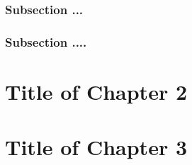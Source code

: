 \documentclass[13pt,a4paper]{extreport}
\begin{document}
\justifying
\subsection{Subsection ...}

\justifying
\subsection{Subsection ....}



\justifying
\chapter{Title of Chapter 2}





\justifying
\chapter{Title of Chapter 3}





































































\end{document}
